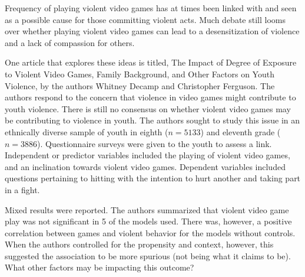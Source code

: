 \documentclass[11pt, chapterprefix=true]{scrbook}\usepackage[]{graphicx}\usepackage[]{color}
\begin{document}
\begin{exercises}
\begin{exercise}
\begin{center}
\end{center}

Frequency of playing violent video games has at times been linked with and seen as a possible cause for those committing violent acts.  Much debate still looms over whether playing violent video games can lead to a desensitization of violence and a lack of compassion for others.

One article that explores these ideas is titled, The Impact of Degree of Exposure to Violent Video Games, Family Background, and Other Factors on Youth Violence, by the authors Whitney Decamp and Christopher Ferguson.  The authors respond to the concern that violence in video games might contribute to youth violence.  There is still no consensus on whether violent video games may be contributing to violence in youth.  The authors sought to study this issue in an ethnically diverse sample of youth in eighth ($n = 5133$) and eleventh grade ($n = 3886$).  Questionnaire surveys were given to the youth to assess a link.  Independent or predictor variables included the playing of violent video games, and an inclination towards violent video games.  Dependent variables included questions pertaining to hitting with the intention to hurt another and taking part in a fight.

Mixed results were reported.  The authors summarized that violent video game play was not significant in 5 of the models used.  There was, however, a positive correlation between games and violent behavior for the models without controls.   When the authors controlled for the propensity and context, however, this suggested the association to be more spurious (not being what it claims to be).  What other factors may be impacting this outcome?


\end{exercise}
\end{exercises}
\end{document}
